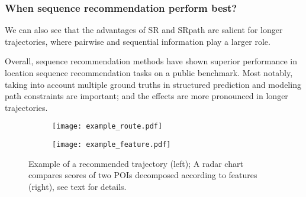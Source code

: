 \subsubsection{When sequence recommendation perform best?}
We can also see that the advantages of {\sc SR} %
and {\sc SRpath} are salient for longer trajectories, where pairwise and sequential information play a larger role.



Overall, sequence recommendation methods have shown superior performance in location sequence recommendation tasks on a public benchmark. Most notably, taking into account multiple ground truths in structured prediction and modeling path constraints are important; and the effects are more pronounced in longer trajectories.



\begin{figure}[htbp]
    \centering
    \begin{subfigure}[t]{.47\linewidth} %
        \centering
        \texttt{[image: example\_route.pdf]}
    \end{subfigure}
    \quad
    \begin{subfigure}[t]{.47\linewidth} 
        \centering
        \texttt{[image: example\_feature.pdf]}
    \end{subfigure}
    \caption{Example of a recommended trajectory (left); A radar chart compares scores of two POIs decomposed according to features (right), see text for details.}
    \label{fig:example}
\end{figure}

